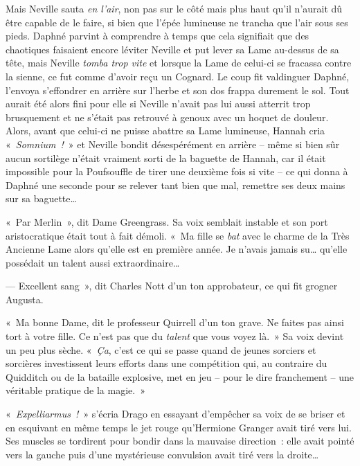 Mais Neville sauta \emph{en l'air}, non pas sur le côté mais plus haut qu'il n'aurait dû être capable de le faire, si bien que l'épée lumineuse ne trancha que l'air sous ses pieds.
Daphné parvint à comprendre à temps que cela signifiait que des chaotiques faisaient encore léviter Neville et put lever sa Lame au-dessus de sa tête, mais Neville \emph{tomba trop vite} et lorsque la Lame de celui-ci se fracassa contre la sienne, ce fut comme d'avoir reçu un Cognard.
Le coup fit valdinguer Daphné, l'envoya s'effondrer en arrière sur l'herbe et son dos frappa durement le sol.
Tout aurait été alors fini pour elle si Neville n'avait pas lui aussi atterrit trop brusquement et ne s'était pas retrouvé à genoux avec un hoquet de douleur.
Alors, avant que celui-ci ne puisse abattre sa Lame lumineuse, Hannah cria «~\emph{Somnium~!}~» et Neville bondit désespérément en arrière -- même si bien sûr aucun sortilège n'était vraiment sorti de la baguette de Hannah, car il était impossible pour la Poufsouffle de tirer une deuxième fois si vite -- ce qui donna à Daphné une seconde pour se relever tant bien que mal, remettre ses deux mains sur sa baguette…

\later

«~Par Merlin~», dit Dame Greengrass.
Sa voix semblait instable et son port aristocratique était tout à fait démoli.
«~Ma fille se \emph{bat} avec le charme de la Très Ancienne Lame alors qu'elle est en première année.
Je n'avais jamais su… qu'elle possédait un talent aussi extraordinaire…

--- Excellent sang~», dit Charles Nott d'un ton approbateur, ce qui fit grogner Augusta.

«~Ma bonne Dame, dit le professeur Quirrell d'un ton grave.
Ne faites pas ainsi tort à votre fille.
Ce n'est pas que du \emph{talent} que vous voyez là.~»
Sa voix devint un peu plus sèche.
«~\emph{Ça}, c'est ce qui se passe quand de jeunes sorciers et sorcières investissent leurs efforts dans une compétition qui, au contraire du Quidditch ou de la bataille explosive, met en jeu -- pour le dire franchement -- une véritable pratique de la magie.~»

\later

«~\emph{Expelliarmus~!}~» s'écria Drago en essayant d'empêcher sa voix de se briser et en esquivant en même temps le jet rouge qu'Hermione Granger avait tiré vers lui.
Ses muscles se tordirent pour bondir dans la mauvaise direction~: elle avait pointé vers la gauche puis d'une mystérieuse convulsion avait tiré vers la droite…


